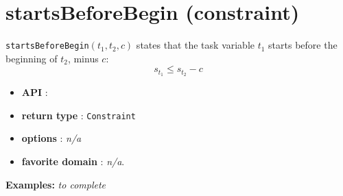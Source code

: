 \section{startsBeforeBegin (constraint)}\label{startsbeforebegin:startsbeforebeginconstraint}\hypertarget{startsbeforebegin:startsbeforebeginconstraint}{}
\begin{notedef}
  \texttt{startsBeforeBegin}$(t_1,t_2,c)$ states that the task variable $t_1$ starts before the beginning of $t_2$, minus $c$:
  $$s_{t_{1}} \le s_{t_{2}} - c$$
\end{notedef}

\begin{itemize}
	\item \textbf{API} :
	\item \textbf{return type} : \texttt{Constraint}
	\item \textbf{options} : \emph{n/a}
	\item \textbf{favorite domain} : \emph{n/a}.
\end{itemize}

\textbf{Examples:}
%
\emph{to complete}